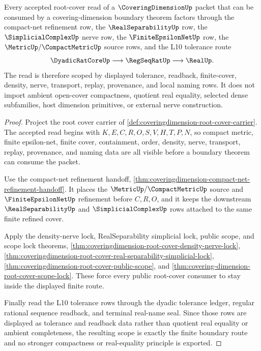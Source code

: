\begin{theorem}
\label{thm:coveringdimension-root-scope-ledger}
Every accepted root-cover read of a $\CoveringDimensionUp$ packet that can be consumed by a covering-dimension boundary theorem factors through the compact-net refinement row, the $\RealSeparabilityUp$ row, the $\SimplicialComplexUp$ nerve row, the $\FiniteEpsilonNetUp$ row, the $\MetricUp/\CompactMetricUp$ source rows, and the L10 tolerance route
$$
\DyadicRatCoreUp
\longrightarrow
\RegSeqRatUp
\longrightarrow
\RealUp .
$$
The read is therefore scoped by displayed tolerance, readback, finite-cover, density, nerve, transport, replay, provenance, and local naming rows. It does not import ambient open-cover compactness, quotient real equality, selected dense subfamilies, host dimension primitives, or external nerve construction.
\end{theorem}
\begin{proof}
Project the root cover carrier of \autoref{def:coveringdimension-root-cover-carrier}. The accepted read begins with $K,E,C,R,O,S,V,H,T,P,N$, so compact metric, finite epsilon-net, finite cover, containment, order, density, nerve, transport, replay, provenance, and naming data are all visible before a boundary theorem can consume the packet.

Use the compact-net refinement handoff, \autoref{thm:coveringdimension-compact-net-refinement-handoff}. It places the $\MetricUp/\CompactMetricUp$ source and $\FiniteEpsilonNetUp$ refinement before $C,R,O$, and it keeps the downstream $\RealSeparabilityUp$ and $\SimplicialComplexUp$ rows attached to the same finite refined cover.

Apply the density-nerve lock, RealSeparability simplicial lock, public scope, and scope lock theorems, \autoref{thm:coveringdimension-root-cover-density-nerve-lock}, \autoref{thm:coveringdimension-root-cover-real-separability-simplicial-lock}, \autoref{thm:coveringdimension-root-cover-public-scope}, and \autoref{thm:covering-dimension-root-cover-scope-lock}. These force every public root-cover consumer to stay inside the displayed finite route.

Finally read the L10 tolerance rows through the dyadic tolerance ledger, regular rational sequence readback, and terminal real-name seal. Since those rows are displayed as tolerance and readback data rather than quotient real equality or ambient completeness, the resulting scope is exactly the finite boundary route and no stronger compactness or real-equality principle is exported.
\end{proof}
